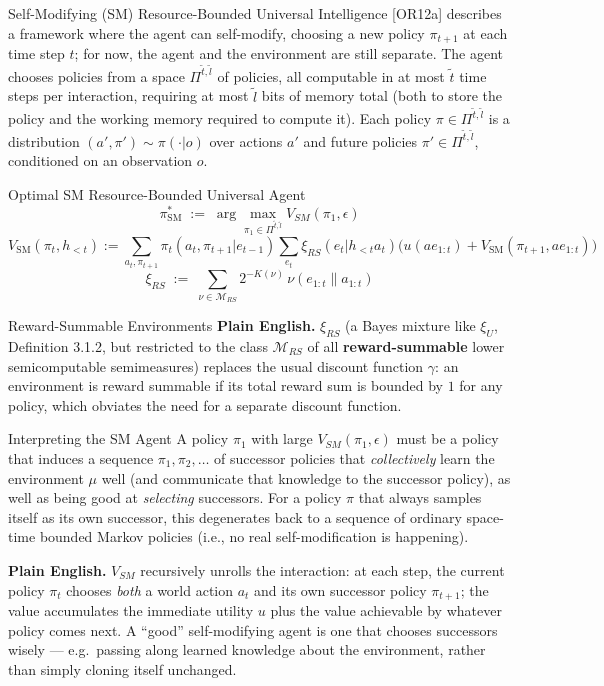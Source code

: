 \documentclass[aspectratio=169,10pt]{beamer}
\newcommand{\Mc}{\mathcal{M}}
\newcommand{\hlt}{h_{<t}}
\begin{document}
\begin{frame}{Self-Modifying (SM) Resource-Bounded Universal Intelligence}
  \small
  [OR12a] describes a framework where the agent can self-modify, choosing
  a new policy $\pi_{t+1}$ at each time step $t$; for now, the agent and
  the environment are still separate. The agent chooses policies from a
  space $\Pi^{\tilde t,\tilde l}$ of policies, all computable in at most
  $\tilde t$ time steps per interaction, requiring at most $\tilde l$ bits
  of memory total (both to store the policy and the working memory
  required to compute it). Each policy $\pi\in\Pi^{\tilde t,\tilde l}$ is
  a distribution $(a',\pi')\sim\pi(\cdot|o)$ over actions $a'$ and future
  policies $\pi'\in\Pi^{\tilde t,\tilde l}$, conditioned on an observation
  $o$.

  \begin{block}{Optimal SM Resource-Bounded Universal Agent}
    \[
      \pi^*_{\mathrm{SM}} \;:=\; \arg\max_{\pi_1\in\Pi^{\tilde t,\tilde l}} V_{SM}(\pi_1,\epsilon)
    \]
    \[
      V_{\mathrm{SM}}(\pi_t,\hlt) := \sum_{a_t,\pi_{t+1}}\pi_t(a_t,\pi_{t+1}|e_{t-1})
      \sum_{e_t}\xi_{RS}(e_t|\hlt a_t)\big(u(ae_{1:t})+V_{\mathrm{SM}}(\pi_{t+1},ae_{1:t})\big)
    \]
    \[
      \xi_{RS} \;:=\; \sum_{\nu\in\Mc_{RS}} 2^{-K(\nu)}\,\nu(e_{1:t}\|a_{1:t})
    \]
  \end{block}
\end{frame}

\begin{frame}{Reward-Summable Environments}
  \textbf{Plain English.} $\xi_{RS}$ (a Bayes mixture like $\xi_U$,
  Definition 3.1.2, but restricted to the class $\Mc_{RS}$ of all
  \textbf{reward-summable} lower semicomputable semimeasures) replaces the
  usual discount function $\gamma$: an environment is reward summable if
  its total reward sum is bounded by $1$ for any policy, which obviates
  the need for a separate discount function.
\end{frame}

\begin{frame}{Interpreting the SM Agent}
  A policy $\pi_1$ with large $V_{SM}(\pi_1,\epsilon)$ must be a policy
  that induces a sequence $\pi_1,\pi_2,\ldots$ of successor policies that
  \emph{collectively} learn the environment $\mu$ well (and communicate
  that knowledge to the successor policy), as well as being good at
  \emph{selecting} successors. For a policy $\pi$ that always samples
  itself as its own successor, this degenerates back to a sequence of
  ordinary space-time bounded Markov policies (i.e., no real
  self-modification is happening).

  \vspace{0.4em}
  \textbf{Plain English.} $V_{SM}$ recursively unrolls the interaction:
  at each step, the current policy $\pi_t$ chooses \emph{both} a world
  action $a_t$ and its own successor policy $\pi_{t+1}$; the value
  accumulates the immediate utility $u$ plus the value achievable by
  whatever policy comes next. A ``good'' self-modifying agent is one that
  chooses successors wisely --- e.g.\ passing along learned knowledge
  about the environment, rather than simply cloning itself unchanged.
\end{frame}
\end{document}
